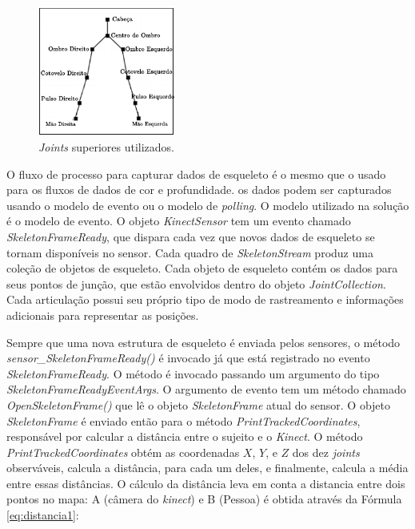 \begin{figure}[ht]
\centering
\includegraphics[width=0.4\textwidth]{images/human_joints_2.png}
\caption{\textit{Joints} superiores utilizados.}
\label{fig:human_joints2}
\end{figure}

O fluxo de processo para capturar dados de esqueleto é o mesmo que o usado para os fluxos de dados de cor e profundidade. os dados podem ser capturados usando o modelo de evento ou o modelo de \textit{polling}. O modelo utilizado na solução é o modelo de evento.  O objeto \textit{KinectSensor} tem um evento chamado \textit{SkeletonFrameReady}, que dispara cada vez que novos dados de esqueleto se tornam disponíveis no sensor. Cada quadro de \textit{SkeletonStream} produz uma coleção de objetos de esqueleto. Cada objeto de esqueleto contém os dados para seus pontos de junção, que estão envolvidos dentro do objeto \textit{JointCollection}. Cada articulação possui seu próprio tipo de modo de rastreamento e informações adicionais para representar as posições.

Sempre que uma nova estrutura de esqueleto é enviada pelos sensores, o método \textit{sensor\_SkeletonFrameReady()} é invocado já que está registrado no evento \textit{SkeletonFrameReady}. O método é invocado passando um argumento do tipo \textit{SkeletonFrameReadyEventArgs}. O argumento de evento tem um método chamado \textit{OpenSkeletonFrame()} que lê o objeto \textit{SkeletonFrame} atual do sensor. O objeto \textit{SkeletonFrame} é enviado então para o método \textit{PrintTrackedCoordinates}, responsável por calcular a distância entre o sujeito e o \textit{Kinect}. O método \textit{PrintTrackedCoordinates} obtém as coordenadas $X$, $Y$, e $Z$ dos dez \textit{joints} observáveis, calcula a distância, para cada um deles, e finalmente, calcula a média entre essas distâncias. O cálculo da distância leva em conta a distancia entre dois pontos no mapa: A (câmera do \textit{kinect}) e B (Pessoa) é obtida através da Fórmula \ref{eq:distancia1}:

